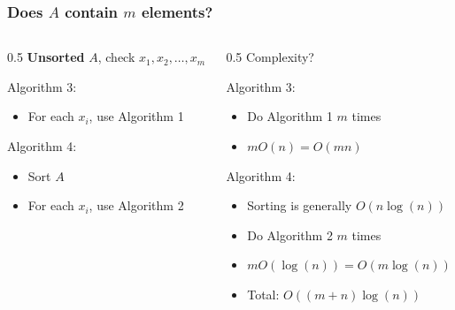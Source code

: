 \documentclass[aspectratio=169,hyperref={bookmarks=false,urlcolor=blue,colorlinks=true},10pt]{beamer}
\begin{document}
\begin{frame}
  \frametitle{Does $A$ contain $m$ elements?}

  \begin{columns}
    \begin{column}{0.5\textwidth}
      \textbf{Unsorted} $A$, check $x_1,x_2,\ldots,x_m$

      \pause
      \vspace{\baselineskip}

      Algorithm 3:
      \begin{itemize}
      \item For each $x_i$, use Algorithm 1
      \end{itemize}

      \pause
      \vspace{\baselineskip}

      Algorithm 4:
      \begin{itemize}
      \item Sort $A$
      \item For each $x_i$, use Algorithm 2
      \end{itemize}
    \end{column}
    \begin{column}{0.5\textwidth}
      \pause
      Complexity?

      \vspace{\baselineskip}

      \pause
      Algorithm 3:
      \begin{itemize}
      \item Do Algorithm 1 $m$ times
      \item $m O(n) = O(mn)$
      \end{itemize}

      \vspace{\baselineskip}

      \pause
      Algorithm 4:
      \begin{itemize}
      \item Sorting is generally $O(n\log(n))$
      \item Do Algorithm 2 $m$ times
      \item $m O(\log(n)) = O(m\log(n))$
      \item Total: $O((m+n)\log(n))$
      \end{itemize}
    \end{column}
  \end{columns}
\end{frame}
\end{document}
